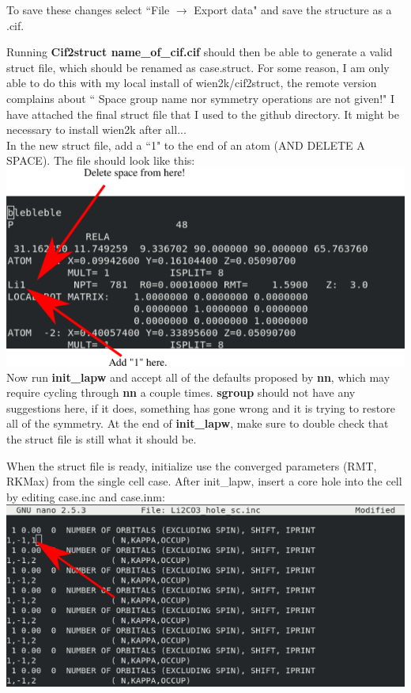 \documentclass[12pt]{article}
\begin{document}
To save these changes select ``File $\to$ Export data" and save the structure as a .cif.  

Running \textbf{Cif2struct name\_of\_cif.cif} should then be able to generate a valid struct file, which should be renamed as case.struct.  For some reason, I am only able to do this with my local install of wien2k/cif2struct, the remote version complains about `` Space group name nor symmetry operations are not given!"  I have attached the final struct file that I used to the github directory. It might be necessary to install wien2k after all... 
 \\

In the new struct file, add a ``1" to the end of an atom (AND DELETE A SPACE).  The file should look like this: \\

\includegraphics[scale=0.8]{./images/break_sym.png}
\\

Now run \textbf{init\_lapw} and accept all of the defaults proposed by \textbf{nn}, which may require cycling through \textbf{nn } a couple times.  \textbf{sgroup} should not have any suggestions here, if it does, something has gone wrong and it is trying to restore all of the symmetry.  At the end of \textbf{init\_lapw}, make sure to double check that the struct file is still what it should be.  


When the struct file is ready, initialize use the converged parameters (RMT, RKMax) from the single cell case.  After init\_lapw, insert a core hole into the cell by editing case.inc and case.inm: \\

\includegraphics[scale=0.5]{./images/hole_inc.png}
\end{document}
